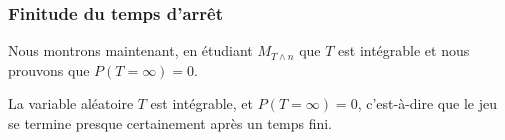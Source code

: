 \subsubsection{Finitude du temps d'arrêt}

Nous montrons maintenant, en étudiant \( M_{T\wedge n}\) que \( T\) est intégrable et nous prouvons que \( P(T=\infty)=0\).

\begin{proposition}
	La variable aléatoire \( T\) est intégrable, et \( P(T=\infty)=0\), c'est-à-dire que le jeu se termine presque certainement après un temps fini.
\end{proposition}

